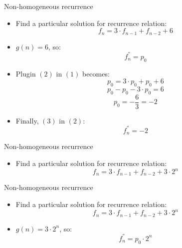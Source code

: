 \documentclass{beamer}
\begin{document}
\begin{frame}{Non-homogeneous recurrence}
    \begin{itemize}
        \item Find a particular solution for recurrence relation:
            \begin{equation}\tag{1}
                f_n = 3 \cdot f_{n-1} + f_{n-2} + 6
            \end{equation}
        \item $g(n) = 6$, so:
            \begin{equation}\tag{2}
                f_n^{''} = p_0
            \end{equation}
        \item Plugin $(2)$ in $(1)$ becomes: 
            $$ p_0 = 3 \cdot p_0 + p_0 + 6 $$
            $$ p_0 - p_0 - 3 \cdot p_0 = 6 $$
            \begin{equation}\tag{3}
                p_0 = - \frac{6}{3} =  -2
            \end{equation}
        \item Finally, $(3)$ in $(2)$:
        $$ f_n^{''} = -2 $$
    \end{itemize}
\end{frame}

\begin{frame}{Non-homogeneous recurrence}
   \begin{itemize}
        \item Find a particular solution for recurrence relation:
            \begin{equation}\tag{1}
                f_n = 3 \cdot f_{n-1} + f_{n-2} + 3 \cdot 2^n
            \end{equation}
      \end{itemize}
\end{frame}

\begin{frame}{Non-homogeneous recurrence}
   \begin{itemize}
        \item Find a particular solution for recurrence relation:
            \begin{equation}\tag{1}
                f_n = 3 \cdot f_{n-1} + f_{n-2} + 3 \cdot 2^n
            \end{equation}
        \item $g(n) = 3 \cdot 2^n$, so:
            \begin{equation}\tag{2}
                f_n^{''} = p_0 \cdot 2^n
            \end{equation}
      \end{itemize}
\end{frame}
\end{document}
